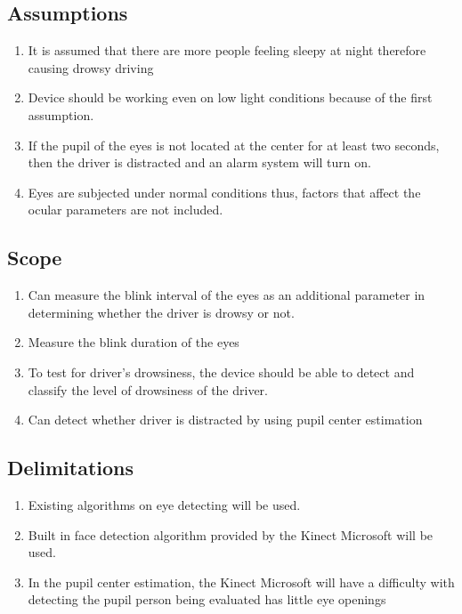 \subsection{Assumptions}
\begin{enumerate}
	
	\item It is assumed that there are more people feeling sleepy at night therefore causing drowsy driving
	
	\item Device should be working even on low light conditions because of the first assumption.
	
	\item If the pupil of the eyes is not located at the center for at least two seconds, then the driver is distracted and an alarm system will turn on.
	
	\item Eyes are subjected under normal conditions thus, factors that affect the ocular parameters are not included.
	
\end{enumerate}

\subsection{Scope}
\begin{enumerate}
	
	\item Can measure the blink interval of the eyes as an additional parameter in determining whether the driver is drowsy or not.
	
	\item Measure the blink duration of the eyes
	
	\item To test for driver’s drowsiness, the device should be able to detect and classify the level of drowsiness of the driver.
	
	\item Can detect whether driver is distracted by using pupil center estimation
	
\end{enumerate}

\subsection{Delimitations}
\begin{enumerate}
	
	\item Existing algorithms on eye detecting will be used.
	
	\item Built in face detection algorithm provided by the Kinect Microsoft will be used.
	
	\item In the pupil center estimation, the Kinect Microsoft will have a difficulty with detecting the pupil person being evaluated has little eye openings
	
\end{enumerate}

